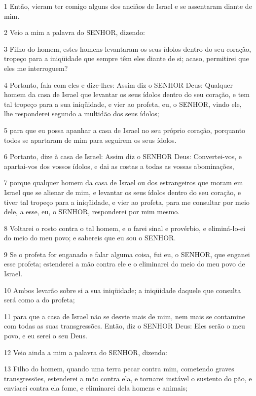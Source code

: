 \par 1 Então, vieram ter comigo alguns dos anciãos de Israel e se assentaram diante de mim.
\par 2 Veio a mim a palavra do SENHOR, dizendo:
\par 3 Filho do homem, estes homens levantaram os seus ídolos dentro do seu coração, tropeço para a iniqüidade que sempre têm eles diante de si; acaso, permitirei que eles me interroguem?
\par 4 Portanto, fala com eles e dize-lhes: Assim diz o SENHOR Deus: Qualquer homem da casa de Israel que levantar os seus ídolos dentro do seu coração, e tem tal tropeço para a sua iniqüidade, e vier ao profeta, eu, o SENHOR, vindo ele, lhe responderei segundo a multidão dos seus ídolos;
\par 5 para que eu possa apanhar a casa de Israel no seu próprio coração, porquanto todos se apartaram de mim para seguirem os seus ídolos.
\par 6 Portanto, dize à casa de Israel: Assim diz o SENHOR Deus: Convertei-vos, e apartai-vos dos vossos ídolos, e dai as costas a todas as vossas abominações,
\par 7 porque qualquer homem da casa de Israel ou dos estrangeiros que moram em Israel que se alienar de mim, e levantar os seus ídolos dentro do seu coração, e tiver tal tropeço para a iniqüidade, e vier ao profeta, para me consultar por meio dele, a esse, eu, o SENHOR, responderei por mim mesmo.
\par 8 Voltarei o rosto contra o tal homem, e o farei sinal e provérbio, e eliminá-lo-ei do meio do meu povo; e sabereis que eu sou o SENHOR.
\par 9 Se o profeta for enganado e falar alguma coisa, fui eu, o SENHOR, que enganei esse profeta; estenderei a mão contra ele e o eliminarei do meio do meu povo de Israel.
\par 10 Ambos levarão sobre si a sua iniqüidade; a iniqüidade daquele que consulta será como a do profeta;
\par 11 para que a casa de Israel não se desvie mais de mim, nem mais se contamine com todas as suas transgressões. Então, diz o SENHOR Deus: Eles serão o meu povo, e eu serei o seu Deus.
\par 12 Veio ainda a mim a palavra do SENHOR, dizendo:
\par 13 Filho do homem, quando uma terra pecar contra mim, cometendo graves transgressões, estenderei a mão contra ela, e tornarei instável o sustento do pão, e enviarei contra ela fome, e eliminarei dela homens e animais;

